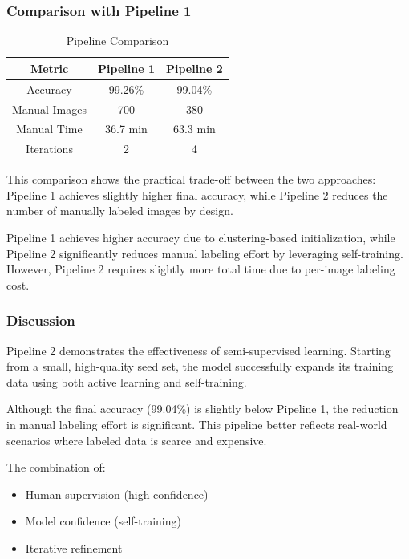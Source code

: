 \documentclass[12pt,a4paper]{article}
\begin{document}
\subsubsection{Comparison with Pipeline 1}

\begin{table}[H]
\centering
\begin{tabular}{ccc}
\toprule
Metric & Pipeline 1 & Pipeline 2 \\
\midrule
Accuracy & 99.26\% & 99.04\% \\
Manual Images & 700 & 380 \\
Manual Time & 36.7 min & 63.3 min \\
Iterations & 2 & 4 \\
\bottomrule
\end{tabular}
\caption{Pipeline Comparison}
\end{table}

This comparison shows the practical trade-off between the two approaches: Pipeline 1 achieves slightly higher final accuracy, while Pipeline 2 reduces the number of manually labeled images by design.

Pipeline 1 achieves higher accuracy due to clustering-based initialization, while Pipeline 2 significantly reduces manual labeling effort by leveraging self-training. However, Pipeline 2 requires slightly more total time due to per-image labeling cost.

\subsubsection{Discussion}

Pipeline 2 demonstrates the effectiveness of semi-supervised learning. Starting from a small, high-quality seed set, the model successfully expands its training data using both active learning and self-training.

Although the final accuracy (99.04\%) is slightly below Pipeline 1, the reduction in manual labeling effort is significant. This pipeline better reflects real-world scenarios where labeled data is scarce and expensive.

The combination of:
\begin{itemize}
    \item Human supervision (high confidence)
    \item Model confidence (self-training)
    \item Iterative refinement
\end{itemize}
\end{document}
